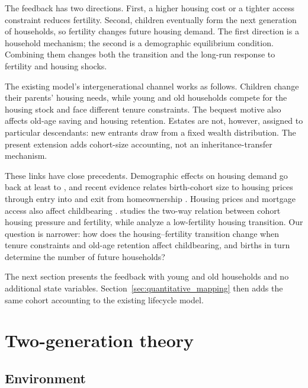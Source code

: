 \documentclass[11pt]{article}
\theoremstyle{definition}
\newcommand{\1}{\mathbf 1}
\begin{document}
The feedback has two directions. First, a higher housing cost or a tighter
access constraint reduces fertility. Second, children eventually form the next
generation of households, so fertility changes future housing demand. The
first direction is a household mechanism; the second is a demographic
equilibrium condition. Combining them changes both the transition and the
long-run response to fertility and housing shocks.

The existing model's intergenerational channel works as follows.
Children change their parents' housing needs, while young and old households
compete for the housing stock and face different tenure constraints. The
bequest motive also affects old-age saving and housing retention. Estates are
not, however, assigned to particular descendants: new entrants draw from a
fixed wealth distribution. The present extension adds cohort-size accounting,
not an inheritance-transfer mechanism.

These links have close precedents. Demographic effects on housing demand go
back at least to \citet{mankiwBabyBoomHousing1989}, and recent evidence relates
birth-cohort size to housing prices through entry into and exit from
homeownership \citep{franckeBabyBoomsAsset2025}. Housing prices and mortgage
access also affect childbearing
\citep{lovenheimFamilyWealthShocks2013,dettlingHousePricesBirth2014,hacamoBabiesMortgageDeregulation2021}.
\citet{malmbergFertilityCycles2012} studies the two-way relation between cohort
housing pressure and fertility, while \citet{leeSuhSuperLowFertility2025}
analyze a low-fertility housing transition. Our question is narrower: how does
the housing--fertility transition change when tenure constraints and old-age
retention affect childbearing, and births in turn determine the number of
future households?

The next section presents the feedback with young and old households and no
additional state variables. Section~\ref{sec:quantitative_mapping} then adds
the same cohort accounting to the existing lifecycle model.

\section{Two-generation theory}
\label{sec:two_generation}

\subsection{Environment}
\end{document}
